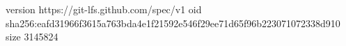 version https://git-lfs.github.com/spec/v1
oid sha256:eafd31966f3615a763bda4e1f21592e546f29ee71d65f96b223071072338d910
size 3145824
